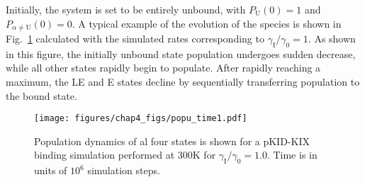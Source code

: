 \documentclass[../talant.diss.submit.tex]{subfiles}
\begin{document}
Initially, the system is set to be entirely unbound, with $P_{\mathrm{U}}(0)=1$ and  $P_{\alpha \ne \mathrm{U}}(0) = 0$.
A typical example of the evolution of the species is shown in Fig.~\ref{fig:popu_time1}
calculated with the simulated rates corresponding to $\gamma_\mathrm{I}/\gamma_0 = 1$.
As shown in this figure, the initially unbound state population undergoes sudden decrease,
while all other states rapidly begin to populate. After rapidly reaching a maximum, the LE and E states
decline by sequentially transferring population to the bound state.


\begin{figure}[htp!]
  \begin{centering}                                                                                        
    \texttt{[image: figures/chap4\_figs/popu\_time1.pdf]}
    \caption{Population dynamics of al four states is shown for a pKID-KIX
      binding simulation performed at 300K for
      $\gamma_{\mathrm{I}} / \gamma_0=1.0$. Time is in units of 
      $10^6$ simulation steps.}
    \label{fig:popu_time1}                                                                                 
  \end{centering}                                                                                          
\end{figure}                                                                                             
\end{document}
